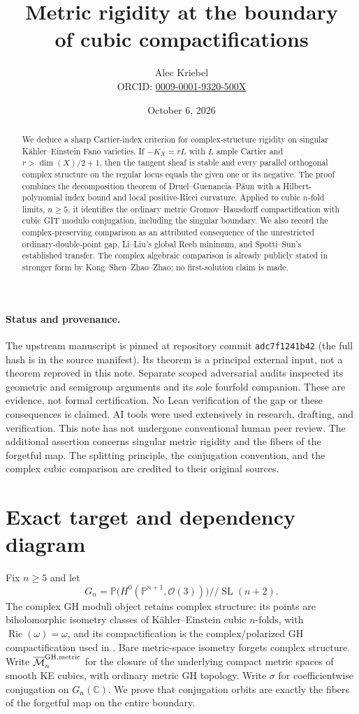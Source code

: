 \documentclass[11pt]{article}
\title{Metric rigidity at the boundary\\of cubic compactifications}
\author{Alec Kriebel\\\small ORCID: \href{https://orcid.org/0009-0001-9320-500X}{0009-0001-9320-500X}}
\date{October 6, 2026}
\newcommand{\C}{\mathbb C}
\newcommand{\PP}{\mathbb P}
\begin{document}
\maketitle
\begin{abstract}
We deduce a sharp Cartier-index criterion for complex-structure rigidity
on singular K\"ahler--Einstein Fano varieties. If $-K_X=rL$ with $L$ ample
Cartier and $r>\dim(X)/2+1$, then the tangent sheaf is stable and every
parallel orthogonal complex structure on the regular locus equals the
given one or its negative. The proof combines the decomposition theorem
of Druel--Guenancia--P\u aun with a Hilbert-polynomial index bound and local
positive-Ricci curvature. Applied to cubic $n$-fold limits, $n\geq5$, it
identifies the ordinary metric Gromov--Hausdorff compactification with
cubic GIT modulo conjugation, including the singular boundary. We also
record the complex-preserving comparison as an attributed consequence
of the unrestricted ordinary-double-point gap, Li--Liu's global Reeb
minimum, and Spotti--Sun's established transfer. The complex algebraic
comparison is already publicly stated in stronger form by
Kong--Shen--Zhao--Zhao; no first-solution claim is made.
\end{abstract}

\paragraph{Status and provenance.}
The upstream manuscript \cite{OAI} is pinned at repository commit
\texttt{adc7f1241b42} (the full hash is in the source manifest). Its theorem is a
principal external input, not a theorem reproved in this note. Separate
scoped adversarial audits inspected its geometric and semigroup arguments
and its sole fourfold companion. These are evidence, not formal
certification. No Lean verification of the gap or these consequences is
claimed. AI tools were used extensively in research, drafting, and
verification. This note has not undergone conventional human peer review.
The additional assertion concerns singular metric rigidity and the fibers
of the forgetful map. The splitting principle, the conjugation convention,
and the complex cubic comparison are credited to their original sources.

\section{Exact target and dependency diagram}
Fix $n\geq5$ and let
\[
 G_n=\PP\bigl(H^0(\PP^{n+1},\mathcal O(3))\bigr)//\operatorname{SL}(n+2).
\]
The complex GH moduli object retains complex structure: its points are
biholomorphic isometry classes of K\"ahler--Einstein cubic $n$-folds,
with $\operatorname{Ric}(\omega)=\omega$, and its compactification is the
complex/polarized GH compactification used in \cite{SS}. Bare metric-space
isometry forgets complex structure. Write
$\overline{\mathcal M}_{n}^{\rm GH,metric}$ for the closure of the
underlying compact metric spaces of smooth KE cubics, with ordinary
metric GH topology. Write $\sigma$ for coefficientwise conjugation on
$G_n(\C)$. We prove that conjugation orbits are exactly the fibers of
the forgetful map on the entire boundary.
\end{document}
